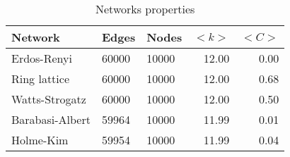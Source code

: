 \begin{table}
\centering
\caption{Networks properties}
\label{tab:networks}
\begin{tabular}{lllrr}
\toprule
         Network &  Edges &  Nodes & $<k>$ & $<C>$ \\
\midrule
     Erdos-Renyi &  60000 &  10000 & 12.00 &  0.00 \\
    Ring lattice &  60000 &  10000 & 12.00 &  0.68 \\
  Watts-Strogatz &  60000 &  10000 & 12.00 &  0.50 \\
 Barabasi-Albert &  59964 &  10000 & 11.99 &  0.01 \\
       Holme-Kim &  59954 &  10000 & 11.99 &  0.04 \\
\bottomrule
\end{tabular}
\end{table}
